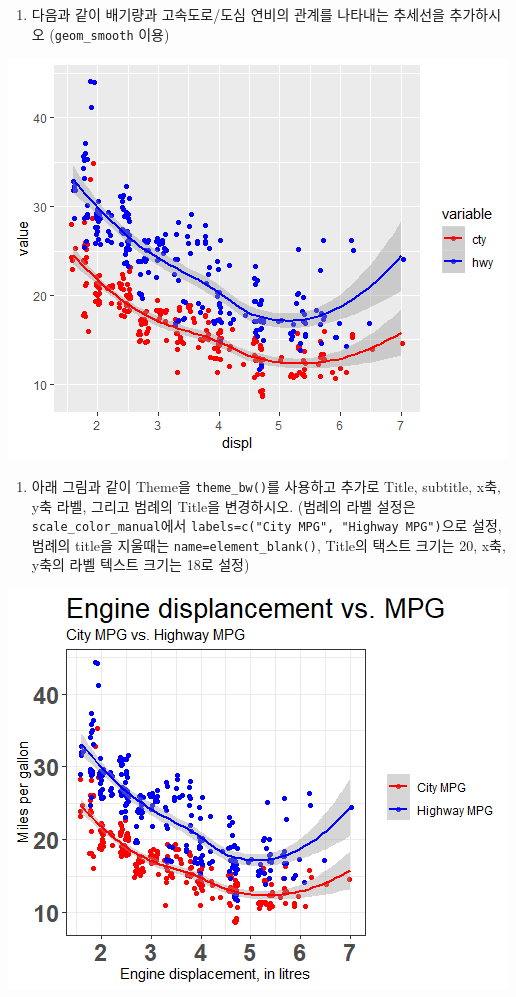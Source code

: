 \documentclass[
]{book}
\providecommand{\tightlist}{%
  \setlength{\itemsep}{0pt}\setlength{\parskip}{0pt}}
\begin{document}
\begin{enumerate}
\def\labelenumi{\arabic{enumi})}
\setcounter{enumi}{3}
\tightlist
\item
  다음과 같이 배기량과 고속도로/도심 연비의 관계를 나타내는 추세선을 추가하시오 (\texttt{geom\_smooth} 이용)
\end{enumerate}

\includegraphics{images/06/ex6-4-4.png}

\begin{enumerate}
\def\labelenumi{\arabic{enumi})}
\setcounter{enumi}{4}
\tightlist
\item
  아래 그림과 같이 Theme을 \texttt{theme\_bw()}를 사용하고 추가로 Title, subtitle, x축, y축 라벨, 그리고 범례의 Title을 변경하시오. (범례의 라벨 설정은 \texttt{scale\_color\_manual}에서 \texttt{labels=c("City\ MPG",\ "Highway\ MPG")}으로 설정, 범례의 title을 지울때는 \texttt{name=element\_blank()}, Title의 택스트 크기는 20, x축, y축의 라벨 텍스트 크기는 18로 설정)
\end{enumerate}

\includegraphics{images/06/ex6-4-5.png}
\end{document}
